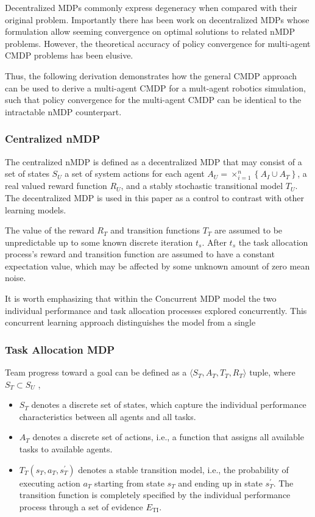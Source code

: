 \documentclass[compsoc,journal,letterpaper,10pt,draftclsnofoot,onecolumn]{IEEEtran}
\begin{document}
Decentralized MDPs commonly express degeneracy when compared with their
original problem. Importantly there has been work on decentralized MDPs
whose formulation allow seeming convergence on optimal solutions to
related nMDP problems. However, the theoretical accuracy of policy
convergence for multi-agent CMDP problems has been elusive.

Thus, the following derivation demonstrates how the general CMDP
approach can be used to derive a multi-agent CMDP for a mult-agent
robotics simulation, such that policy convergence for the multi-agent
CMDP can be identical to the intractable nMDP counterpart.

\subsubsection{Centralized nMDP}\label{centralized-nmdp}

The centralized nMDP is defined as a decentralized MDP that may consist
of a set of states \(S_{U}\) a set of system actions for each agent
\(A_{U} = \times_{i = 1}^{n}\left\{ A_{I} \cup A_{T} \right\}\), a real
valued reward function \(R_{U}\), and a stably stochastic transitional
model \(T_{U}\). The decentralized MDP is used in this paper as a
control to contrast with other learning models.

The value of the reward \(R_{T}\) and transition functions \(T_{T}\) are
assumed to be unpredictable up to some known discrete iteration
\(t_{s}\). After \(t_{s}\) the task allocation process's reward and
transition function are assumed to have a constant expectation value,
which may be affected by some unknown amount of zero mean noise.

It is worth emphasizing that within the Concurrent MDP model the two
individual performance and task allocation processes explored
concurrently. This concurrent learning approach distinguishes the model
from a single

\subsubsection{Task Allocation MDP}\label{task-allocation-mdp}

Team progress toward a goal can be defined as a
\( \langle S_{T}, A_{T}, T_{T}, R_{T} \rangle \) tuple, where\(S_{T} \subset S_{U}\) ,

\begin{itemize}
\item
  \(S_{T}\) denotes a discrete set of states, which capture the
  individual performance characteristics between all agents and all
  tasks.
\item
  \(A_{T}\) denotes a discrete set of actions, i.e., a function that
  assigns all available tasks to available agents.
\item
  \(T_{T}\left( s_{T}, a_{T}, s_{T}^{'} \right)\) denotes a stable
  transition model, i.e., the probability of executing action \(a_{T}\)
  starting from state \(s_{T}\) and ending up in state \(s_{T}^{'}\).
  The transition function is completely specified by the individual
  performance process through a set of evidence \(E_{\text{TI}}\).
\end{itemize}
\end{document}
